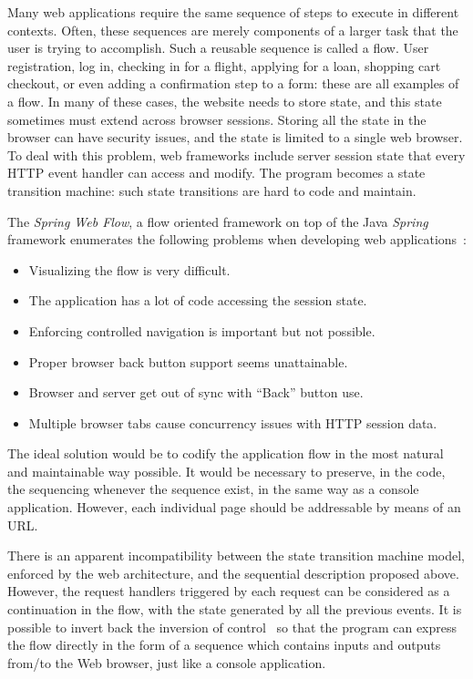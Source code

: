 \documentclass{tmr}
\begin{document}
Many web applications require the same sequence of steps to execute in different contexts. Often, these sequences are merely components of a larger task that the user is trying to accomplish. Such a reusable sequence is called a flow. User registration, log in, checking in for a flight, applying for a loan, shopping cart checkout, or even adding a confirmation step to a form: these are all examples of a flow. In many of these cases, the website needs to store state, and this state sometimes must extend across browser sessions. Storing all the state in the browser can have security issues, and the state is limited to a single web browser. To deal with this problem, web frameworks include server session state that every HTTP event handler can access and modify. The program 
becomes a state transition machine: such state transitions are hard to code and maintain. 
 
The \textit{Spring Web Flow}, a flow oriented framework on top of the Java \textit{Spring} framework enumerates the following problems when developing web applications~\cite{auth:spring}: 
 
\begin{itemize} 
\item Visualizing the flow is very difficult. 
\item The application has a lot of code accessing the session state. 
\item Enforcing controlled navigation is important but not possible. 
\item Proper browser back button support seems unattainable. 
\item Browser and server get out of sync with ``Back'' button use. 
\item Multiple browser tabs cause concurrency issues with HTTP session data. 
\end{itemize} 
 
The ideal solution would be to codify the application flow in the most natural and maintainable way possible. It would be necessary to preserve, in the code, the sequencing whenever the sequence exist, in the same way as a console application. However, each individual page should be addressable  by means of an URL\@.
 
 
There is an apparent incompatibility between the state transition machine model, enforced by the web architecture, and the sequential description proposed above. However, the request handlers triggered by each request can be considered as a continuation in the flow, with the state generated by all the previous events. It is possible to invert back the inversion of control~\cite{invertingback} so that the program can express the flow directly in the form of a sequence which contains inputs and outputs from/to the Web browser, just like a console application. 
\end{document}
